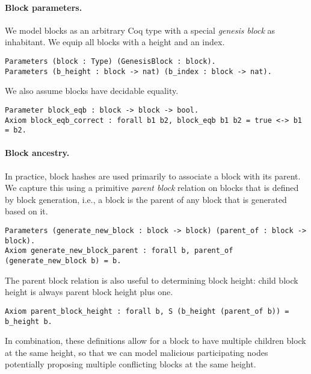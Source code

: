 \documentclass{easychair}
\begin{document}
\paragraph{Block parameters.}
%
We model blocks as an arbitrary Coq type with a special \emph{genesis block} as inhabitant. We equip all blocks with a height and an index.
\begin{lstlisting}[language=Coq]
Parameters (block : Type) (GenesisBlock : block).
Parameters (b_height : block -> nat) (b_index : block -> nat).
\end{lstlisting}
We also assume blocks have decidable equality.
\begin{lstlisting}[language=Coq]
Parameter block_eqb : block -> block -> bool.
Axiom block_eqb_correct : forall b1 b2, block_eqb b1 b2 = true <-> b1 = b2.
\end{lstlisting}

\paragraph{Block ancestry.}
%
In practice, block hashes are used primarily to associate a block with its parent. We capture this using a primitive \emph{parent block} relation on blocks that is defined by block generation, i.e., a block is the parent of any block that is generated based on it. 
\begin{lstlisting}[language=Coq]
Parameters (generate_new_block : block -> block) (parent_of : block -> block). 
Axiom generate_new_block_parent : forall b, parent_of (generate_new_block b) = b.
\end{lstlisting} 
The parent block relation is also useful to determining block height: child block height is always parent block height plus one. 
\begin{lstlisting}[language=Coq]
Axiom parent_block_height : forall b, S (b_height (parent_of b)) = b_height b.
\end{lstlisting} 

In combination, these definitions allow for a block to have multiple children block at the same height, so that we can model malicious participating nodes potentially proposing multiple conflicting blocks at the same height.
\end{document}
